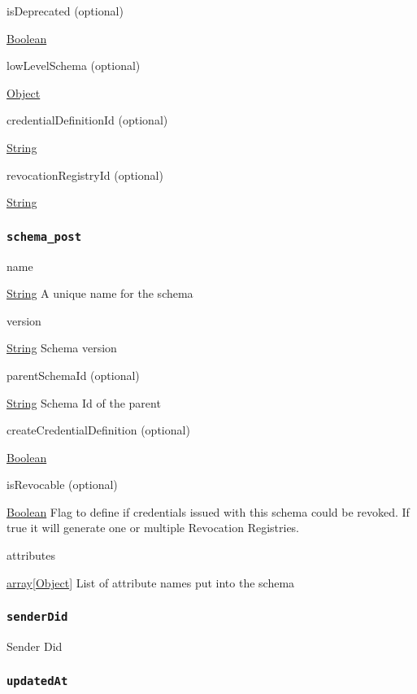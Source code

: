 isDeprecated (optional)

{\protect\hyperlink{boolean}{Boolean}}

lowLevelSchema (optional)

{\protect\hyperlink{object}{Object}}

credentialDefinitionId (optional)

{\protect\hyperlink{string}{String}}

revocationRegistryId (optional)

{\protect\hyperlink{string}{String}}

\hypertarget{schema_post}{%
\subsubsection{\texorpdfstring{\protect\hypertarget{schema_post}{}{\texttt{schema\_post}}}{schema\_post}}\label{schema_post}}

name

{\protect\hyperlink{string}{String}} A unique name for the schema

version

{\protect\hyperlink{string}{String}} Schema version

parentSchemaId (optional)

{\protect\hyperlink{string}{String}} Schema Id of the parent

createCredentialDefinition (optional)

{\protect\hyperlink{boolean}{Boolean}}

isRevocable (optional)

{\protect\hyperlink{boolean}{Boolean}} Flag to define if credentials
issued with this schema could be revoked. If true it will generate one
or multiple Revocation Registries.

attributes

{\protect\hyperlink{object}{array{[}Object{]}}} List of attribute names
put into the schema

\hypertarget{senderdid}{%
\subsubsection{\texorpdfstring{\protect\hypertarget{senderDid}{}{\texttt{senderDid}}}{senderDid}}\label{senderdid}}

Sender Did

\hypertarget{updatedat}{%
\subsubsection{\texorpdfstring{\protect\hypertarget{updatedAt}{}{\texttt{updatedAt}}}{updatedAt}}\label{updatedat}}

